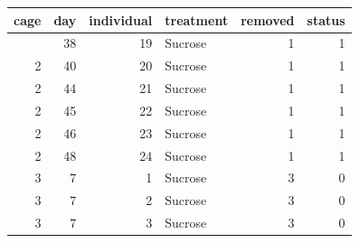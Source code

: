 \documentclass[
  brazilian,
  12pt,
  a4paper,
]{article}
\begin{document}
\begin{longtable}[]{@{}rrrlrr@{}}
\toprule\noalign{}
cage & day & individual & treatment & removed & status \\
\midrule\noalign{}
\endhead
\bottomrule\noalign{}
\endlastfoot
2 & 38 & 19 & Sucrose & 1 & 1 \\
2 & 40 & 20 & Sucrose & 1 & 1 \\
2 & 44 & 21 & Sucrose & 1 & 1 \\
2 & 45 & 22 & Sucrose & 1 & 1 \\
2 & 46 & 23 & Sucrose & 1 & 1 \\
2 & 48 & 24 & Sucrose & 1 & 1 \\
3 & 7 & 1 & Sucrose & 3 & 0 \\
3 & 7 & 2 & Sucrose & 3 & 0 \\
3 & 7 & 3 & Sucrose & 3 & 0 \\
\end{longtable}
\end{document}
